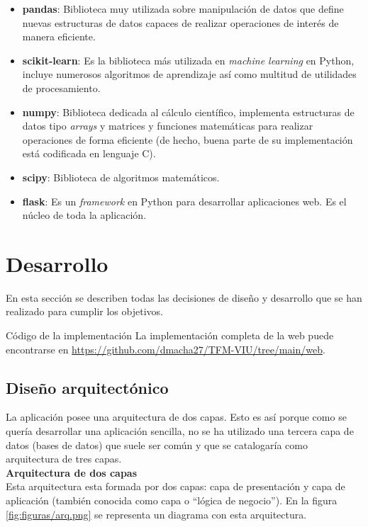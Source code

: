 \begin{itemize}
    \item \textbf{pandas}: Biblioteca muy utilizada sobre manipulación de datos que define nuevas estructuras de datos capaces de realizar operaciones de interés de manera eficiente.
    \item \textbf{scikit-learn}: Es la biblioteca más utilizada en \textit{machine learning} en Python, incluye numerosos algoritmos de aprendizaje así como multitud de utilidades de procesamiento.
    \item \textbf{numpy}: Biblioteca dedicada al cálculo científico, implementa estructuras de datos tipo \textit{arrays} y matrices y funciones matemáticas para realizar operaciones de forma eficiente (de hecho, buena parte de su implementación está codificada en lenguaje C).
    \item \textbf{scipy}:  Biblioteca de algoritmos matemáticos.
    \item \textbf{flask}: Es un \textit{framework} en Python para desarrollar aplicaciones web. Es el núcleo de toda la aplicación.
\end{itemize}

\section{Desarrollo}
En esta sección se describen todas las decisiones de diseño y desarrollo que se han realizado para cumplir los objetivos.

\begin{mainbox}{Código de la implementación}
    La implementación completa de la web puede encontrarse en \url{https://github.com/dmacha27/TFM-VIU/tree/main/web}. 
\end{mainbox}

\subsection{Diseño arquitectónico}
La aplicación posee una arquitectura de dos capas. Esto es así porque como se quería desarrollar una aplicación sencilla, no se ha utilizado una tercera capa de datos (bases de datos) que suele ser común y que se catalogaría como arquitectura de tres capas.\\

\noindent\textbf{\large Arquitectura de dos capas} \\
Esta arquitectura esta formada por dos capas: capa de presentación y capa de aplicación (también conocida como capa o ``lógica de negocio''). En la figura \ref{fig:figuras/arq.png} se representa un diagrama con esta arquitectura.

